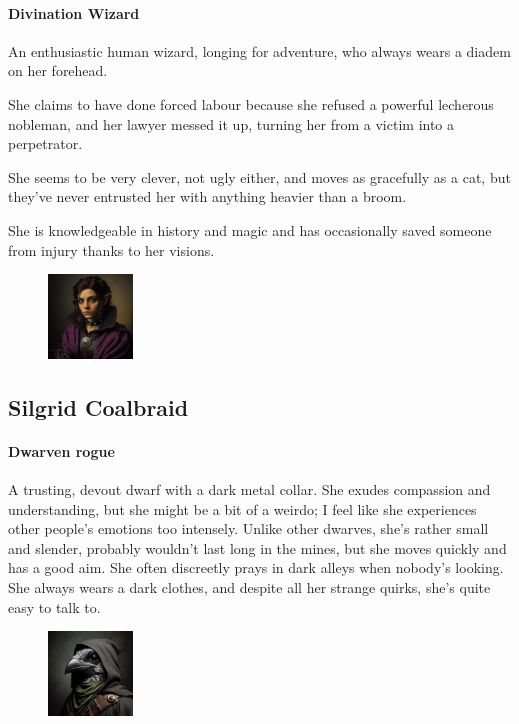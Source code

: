 \documentclass[10pt,onecolumn,twoside,openany,bg=full,layout=true]{dndbook}
\begin{document}
  \paragraph{Divination Wizard}
  An enthusiastic human wizard, longing for adventure, who always wears a diadem on her forehead.\par
  She claims to have done forced labour because she refused a powerful lecherous nobleman, and her lawyer messed it up,
  turning her from a victim into a perpetrator.\par
  She seems to be very clever, not ugly either, and moves as gracefully as a cat, but they've never entrusted her
  with anything heavier than a broom.\par
  She is knowledgeable in history and magic and has occasionally saved someone from injury thanks to her visions.

  \begin{figure}
    \begin{center}
      \includegraphics[width=0.2\textwidth]{img/characters/silgrid}
    \end{center}
  \end{figure}
  \subsection{Silgrid Coalbraid}\label{subsec:silgrid-coalbraid}
  \paragraph{Dwarven rogue} A trusting, devout dwarf with a dark metal collar.
  She exudes compassion and understanding, but she might be a bit of a weirdo; I feel like she experiences other
  people's emotions too intensely.
  Unlike other dwarves, she's rather small and slender, probably wouldn't last long
  in the mines, but she moves quickly and has a good aim.
  She often discreetly prays in dark alleys when nobody's looking.
  She always wears a dark clothes, and despite all her strange quirks, she's quite easy to talk to.

  \begin{figure}
    \begin{center}
      \includegraphics[width=0.2\textwidth]{img/characters/sally}
    \end{center}
  \end{figure}
\end{document}

